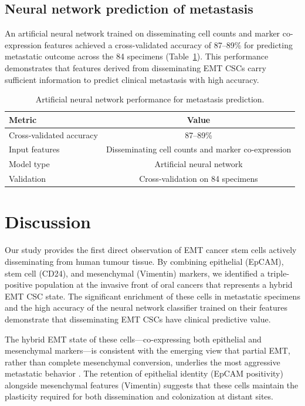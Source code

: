 \documentclass[11pt]{article}
\begin{document}
\subsection{Neural network prediction of metastasis}
An artificial neural network trained on disseminating cell counts and marker co-expression features achieved a cross-validated accuracy of 87--89\% for predicting metastatic outcome across the 84 specimens (Table~\ref{tab:ann}). This performance demonstrates that features derived from disseminating EMT CSCs carry sufficient information to predict clinical metastasis with high accuracy.

\begin{table}[h]
\centering
\caption{Artificial neural network performance for metastasis prediction.}
\label{tab:ann}
\begin{tabular}{lc}
\toprule
Metric & Value \\
\midrule
Cross-validated accuracy & 87--89\% \\
Input features & Disseminating cell counts and marker co-expression \\
Model type & Artificial neural network \\
Validation & Cross-validation on 84 specimens \\
\bottomrule
\end{tabular}
\end{table}

\section{Discussion}

Our study provides the first direct observation of EMT cancer stem cells actively disseminating from human tumour tissue. By combining epithelial (EpCAM), stem cell (CD24), and mesenchymal (Vimentin) markers, we identified a triple-positive population at the invasive front of oral cancers that represents a hybrid EMT CSC state. The significant enrichment of these cells in metastatic specimens and the high accuracy of the neural network classifier trained on their features demonstrate that disseminating EMT CSCs have clinical predictive value.

The hybrid EMT state of these cells---co-expressing both epithelial and mesenchymal markers---is consistent with the emerging view that partial EMT, rather than complete mesenchymal conversion, underlies the most aggressive metastatic behavior \citep{pastushenko2018identification, nieto2016emt}. The retention of epithelial identity (EpCAM positivity) alongside mesenchymal features (Vimentin) suggests that these cells maintain the plasticity required for both dissemination and colonization at distant sites.
\end{document}
